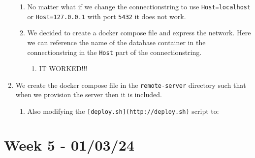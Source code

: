\begin{enumerate}
    \begin{enumerate}
    \item No matter what if we change the connectionstring to use \texttt{Host=localhost} or \texttt{Host=127.0.0.1} with port \texttt{5432} it does not work.
    \item We decided to create a docker compose file and express the network. Here we can reference the name of the database container in the connectionstring in the \texttt{Host} part of the connectionstring.

        \begin{enumerate}
            \item IT WORKED!!!
        \end{enumerate}
    \end{enumerate}
    \item We create the docker compose file in the \texttt{remote-server} directory such that when we provision the server then it is included.

    \begin{enumerate}
        \item Also modifying the \texttt{{[}deploy.sh{]}(http://deploy.sh)} script to:


    \end{enumerate}
\end{enumerate}

\section{Week 5 - 01/03/24}
\label{log:week5}

